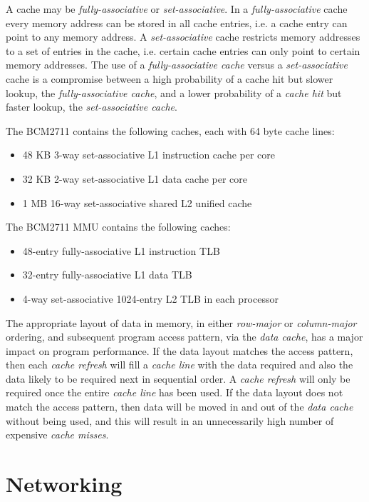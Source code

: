 A cache may be \emph{fully-associative} or \emph{set-associative}. In a \emph{fully-associative} cache every memory address can be stored in all cache entries, i.e. a cache entry can point to any memory address. A \emph{set-associative} cache restricts memory addresses to a set of entries in the cache, i.e. certain cache entries can only point to certain memory addresses. The use of a \emph{fully-associative cache} versus a \emph{set-associative} cache is a compromise between a high probability of a cache hit but slower lookup, the \emph{fully-associative cache}, and a lower probability of a \emph{cache hit} but faster lookup, the \emph{set-associative cache}.      

The BCM2711 contains the following caches, each with 64 byte cache lines:
\begin{itemize}
\item 48 KB 3-way set-associative L1 instruction cache per core
\item 32 KB 2-way set-associative L1 data cache per core
\item 1 MB 16-way set-associative shared L2 unified cache
\end{itemize}

The BCM2711 MMU contains the following caches:
\begin{itemize}
\item 48-entry fully-associative L1 instruction TLB
\item 32-entry fully-associative L1 data TLB
\item 4-way set-associative 1024-entry L2 TLB in each processor
\end{itemize}

The appropriate layout of data in memory, in either \emph{row-major} or \emph{column-major} ordering, and subsequent program access pattern, via the \emph{data cache}, has a major impact on program performance. If the data layout matches the access pattern, then each \emph{cache refresh} will fill a \emph{cache line} with the data required and also the data likely to be required next in sequential order. A \emph{cache refresh} will only be required once the entire \emph{cache line} has been used. If the data layout does not match the access pattern, then data will be moved in and out of the \emph{data cache} without being used, and this will result in an unnecessarily high number of expensive \emph{cache misses}. 


%
%
\section{Networking}

